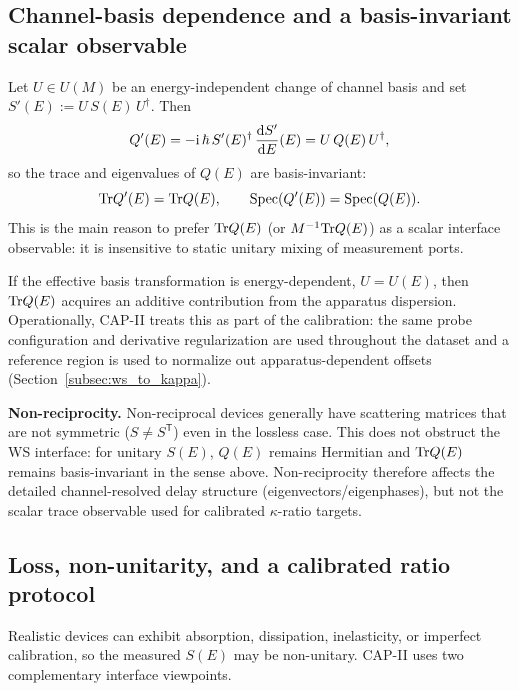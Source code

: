 \subsection{Channel-basis dependence and a basis-invariant scalar observable}
\label{app:ws_basis_invariance}

Let $U\in U(M)$ be an energy-independent change of channel basis and set $S'(E):=U\,S(E)\,U^\dagger$.
Then
\begin{equation}
  Q'(E) = -\mathrm{i}\,\hbar\,S'(E)^\dagger\,\frac{\mathrm{d} S'}{\mathrm{d} E}(E)
  = U\,Q(E)\,U^\dagger,
\end{equation}
so the trace and eigenvalues of $Q(E)$ are basis-invariant:
\begin{equation}
  \mathrm{Tr} Q'(E)=\mathrm{Tr} Q(E),
  \qquad
  \mathrm{Spec}(Q'(E))=\mathrm{Spec}(Q(E)).
\end{equation}
This is the main reason to prefer $\mathrm{Tr} Q(E)$ (or $M^{-1}\mathrm{Tr} Q(E)$) as a scalar interface observable: it is insensitive to static unitary mixing of measurement ports.
\par
\noindent If the effective basis transformation is energy-dependent, $U=U(E)$, then $\mathrm{Tr} Q(E)$ acquires an additive contribution from the apparatus dispersion.
Operationally, CAP-II treats this as part of the calibration: the same probe configuration and derivative regularization are used throughout the dataset and a reference region is used to normalize out apparatus-dependent offsets (Section~\ref{subsec:ws_to_kappa}).
\par
\noindent\textbf{Non-reciprocity.}
Non-reciprocal devices generally have scattering matrices that are not symmetric ($S\neq S^{\mathsf{T}}$) even in the lossless case.
This does not obstruct the WS interface: for unitary $S(E)$, $Q(E)$ remains Hermitian and $\mathrm{Tr} Q(E)$ remains basis-invariant in the sense above.
Non-reciprocity therefore affects the detailed channel-resolved delay structure (eigenvectors/eigenphases), but not the scalar trace observable used for calibrated $\kappa$-ratio targets.

\subsection{Loss, non-unitarity, and a calibrated ratio protocol}
\label{app:ws_nonunitary}

Realistic devices can exhibit absorption, dissipation, inelasticity, or imperfect calibration, so the measured $S(E)$ may be non-unitary.
CAP-II uses two complementary interface viewpoints.


